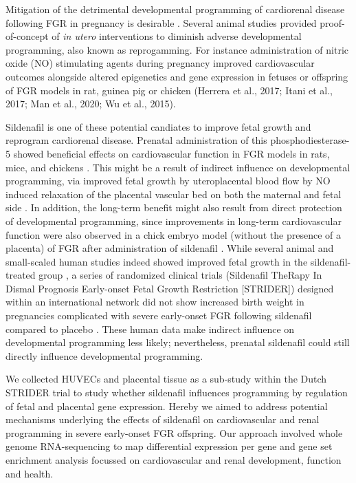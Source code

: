 \documentclass[authordate, empirical]{jote-new-article}
\begin{document}
	Mitigation of the detrimental developmental programming of cardiorenal disease following FGR in pregnancy is desirable \parencites{Paauw2016}. Several animal studies provided proof-of-concept of \emph{in utero }interventions to diminish adverse developmental programming, also known as reprogamming. For instance administration of nitric oxide (NO) stimulating agents during pregnancy improved cardiovascular outcomes alongside altered epigenetics and gene expression in fetuses or offspring of FGR models in rat, guinea pig or chicken (Herrera et al., 2017; Itani et al., 2017; Man et al., 2020; Wu et al., 2015).



	Sildenafil is one of these potential candiates to improve fetal growth and reprogram cardiorenal disease. Prenatal administration of this phosphodiesterase-5 showed beneficial effects on cardiovascular function in FGR models in rats, mice, and chickens \parencites{Itani2017}{Mills2018}{Terstappen2019}. This might be a result of indirect influence on developmental programming, via improved fetal growth by uteroplacental blood flow by NO induced relaxation of the placental vascular bed on both the maternal and fetal side \parencites{Krause2011}{Wareing2006}. In addition, the long-term benefit might also result from direct protection of developmental programming, since improvements in long-term cardiovascular function were also observed in a chick embryo model (without the presence of a placenta) of FGR after administration of sildenafil \parencites{Itani2017}. While several animal and small-scaled human studies indeed showed improved fetal growth in the sildenafil-treated group \parencites{Paauw2017}{Dadelszen2011}, a series of randomized clinical trials (Sildenafil TheRapy In Dismal Prognosis Early-onset Fetal Growth Restriction [STRIDER]) designed within an international network did not show increased birth weight in pregnancies complicated with severe early-onset FGR following sildenafil compared to placebo \parencites{Pels2020}{Sharp2018}{Groom2019}. These human data make indirect influence on developmental programming less likely; nevertheless, prenatal sildenafil could still directly influence developmental programming.



	We collected HUVECs and placental tissue as a sub-study within the Dutch STRIDER trial to study whether sildenafil influences programming by regulation of fetal and placental gene expression. Hereby we aimed to address potential mechanisms underlying the effects of sildenafil on cardiovascular and renal programming in severe early-onset FGR offspring. Our approach involved whole genome RNA-sequencing to map differential expression per gene and gene set enrichment analysis focussed on cardiovascular and renal development, function and health.
\end{document}
